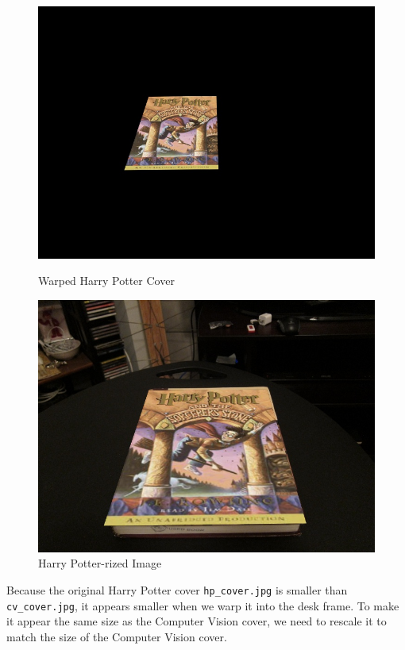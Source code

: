 \begin{problem}[9]
\begin{figure}[H]
  \centering
  \begin{minipage}{0.49\textwidth}
    \includegraphics[width=\textwidth]{images/warped-cover.jpg}
    \caption{Warped Harry Potter Cover}
    \label{fig:warped-cover}
  \end{minipage}
  \begin{minipage}{0.49\textwidth}
    \includegraphics[width=\textwidth]{images/composite-image.jpg}
    \caption{Harry Potter-rized Image}
    \label{fig:composite-image}
  \end{minipage}
\end{figure}

\step
Because the original Harry Potter cover \verb|hp_cover.jpg| is smaller than
\verb|cv_cover.jpg|, it appears smaller when we warp it into the desk frame.
To make it appear the same size as the Computer Vision cover, we need to
rescale it to match the size of the Computer Vision cover.

\end{problem}

